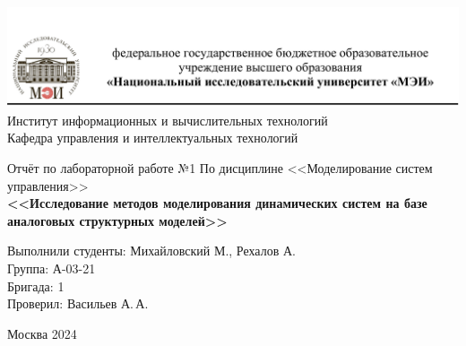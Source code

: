 \begin{titlepage}
	\newpage
	\begin{center}
		\includegraphics[width=\textwidth]{png/tit.png}
		Институт информационных и вычислительных технологий \\
			Кафедра управления и интеллектуальных технологий
		\vspace{1.25cm}
	\end{center}
	
	\vspace{1.2em}
	
	\begin{center}
		\begin{spacing}{1}
			{\Large Отчёт по лабораторной работе №1 \linebreak
			По дисциплине <<Моделирование систем управления>> \\}
			\large{\bf<<Исследование методов моделирования динамических систем на базе аналоговых структурных моделей>>}
		\end{spacing}
	\end{center}
	
	\vspace{5em}
	

	\vspace{6em}
	
		\noindent Выполнили студенты: Михайловский М., Рехалов А. \\
		Группа: А-03-21 \\
		Бригада: 1\\
		Проверил: Васильев А.\,А.
	
	
	\vspace{\fill}
	
	\begin{center}
		Москва 2024
	\end{center}
	
\end{titlepage}